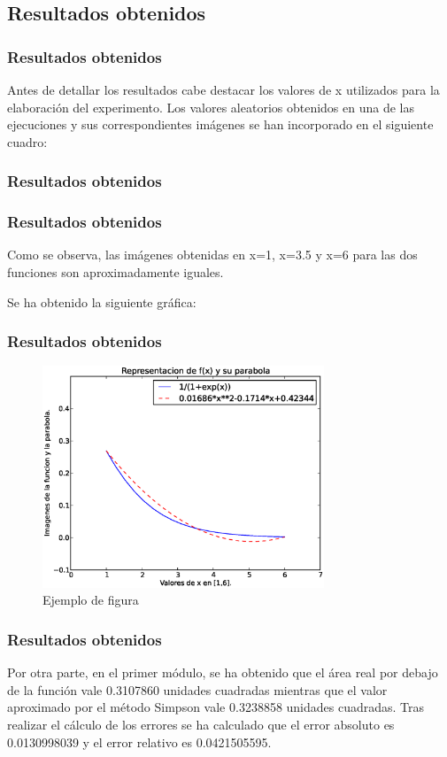 \documentclass{beamer}
\begin{document}
\subsection{Resultados obtenidos}
\begin{frame}
\frametitle{Resultados obtenidos}
Antes de detallar los resultados cabe destacar los valores de x utilizados para la elaboración
del experimento. Los valores aleatorios obtenidos en una de las 
ejecuciones y sus correspondientes imágenes se han incorporado en el siguiente cuadro:
\end{frame}
\begin{frame}
\frametitle{Resultados obtenidos}

\end{frame}
\begin{frame}
\frametitle{Resultados obtenidos}
Como se observa, las imágenes obtenidas en x=1, x=3.5 y x=6 para las dos funciones son 
aproximadamente iguales.
	
	Se ha obtenido la siguiente gráfica:
\end{frame}
\begin{frame}
\frametitle{Resultados obtenidos}
\begin{figure}[!th]
\begin{center}
\includegraphics[width=0.75\textwidth]{img/rep_funcion.eps}
\caption{Ejemplo de figura}
\label{fig:1}
\end{center}
\end{figure}
\end{frame}
\begin{frame}
\frametitle{Resultados obtenidos}
Por otra parte, en el primer módulo, se ha obtenido que el área real por debajo de la función
vale 0.3107860 unidades cuadradas mientras que el valor aproximado por el método Simpson vale
0.3238858 unidades cuadradas. Tras realizar el cálculo de los errores se ha calculado que
el error absoluto es 0.0130998039 y el error relativo es 0.0421505595.
\end{frame}
\end{document}
